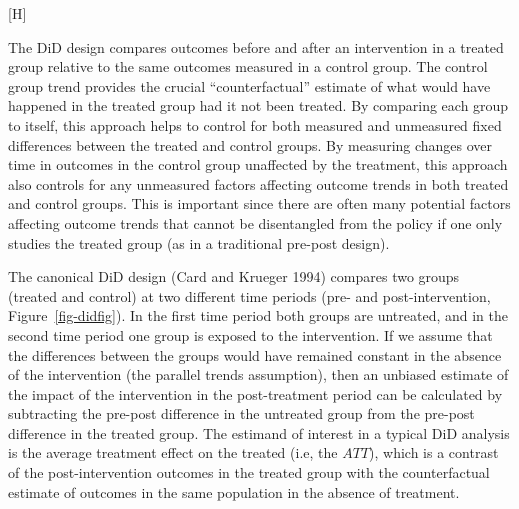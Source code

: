\documentclass[
  letterpaper,
  DIV=11,
  numbers=noendperiod]{scrartcl}
\makeatletter
\renewenvironment{figure}%
   {\renewcommand\familydefault\sfdefault
    \@float{figure}}
   {\end@float}
\providecommand{\DIFaddbeginFL}{} %
\providecommand{\DIFaddendFL}{} %
\providecommand{\DIFdelbeginFL}{} %
\providecommand{\DIFdelendFL}{} %
\newcommand{\DIFscaledelfig}{0.5}
\newlength{\DIFdelgraphicswidth} %
\newlength{\DIFdelgraphicsheight} %
\newcommand{\DIFaddincludegraphics}[2][]{{\color{blue}\fbox{\DIFOincludegraphics[#1]{#2}}}} %
\newcommand{\DIFdelincludegraphics}[2][]{%
\sbox{\DIFdelgraphicsbox}{\DIFOincludegraphics[#1]{#2}}%
\settoboxwidth{\DIFdelgraphicswidth}{\DIFdelgraphicsbox} %
\settoboxtotalheight{\DIFdelgraphicsheight}{\DIFdelgraphicsbox} %
\scalebox{\DIFscaledelfig}{%
\parbox[b]{\DIFdelgraphicswidth}{\usebox{\DIFdelgraphicsbox}\\[-\baselineskip] \rule{\DIFdelgraphicswidth}{0em}}\llap{\resizebox{\DIFdelgraphicswidth}{\DIFdelgraphicsheight}{%
\setlength{\unitlength}{\DIFdelgraphicswidth}%
\begin{picture}(1,1)%
\thicklines\linethickness{2pt} %
{\color[rgb]{1,0,0}\put(0,0){\framebox(1,1){}}}%
{\color[rgb]{1,0,0}\put(0,0){\line( 1,1){1}}}%
{\color[rgb]{1,0,0}\put(0,1){\line(1,-1){1}}}%
\end{picture}%
}\hspace*{3pt}}} %
} %
\DeclareRobustCommand{\DIFaddbeginFL}{\DIFOaddbeginFL \let\includegraphics\DIFaddincludegraphics} %
\DeclareRobustCommand{\DIFaddendFL}{\DIFOaddendFL \let\includegraphics\DIFOincludegraphics} %
\DeclareRobustCommand{\DIFdelbeginFL}{\DIFOdelbeginFL \let\includegraphics\DIFdelincludegraphics} %
\DeclareRobustCommand{\DIFdelendFL}{\DIFOaddendFL \let\includegraphics\DIFOincludegraphics} %
\makeatother
\begin{document}
\begin{figure}[H]

\DIFdelbeginFL %
\DIFdelendFL \DIFaddbeginFL {}
\DIFaddendFL 

\DIFdelbeginFL %

\DIFdelendFL \caption{\label{fig-didfig}Stylized example of
difference-in-differences}

\end{figure}%

The DiD design compares outcomes before and after an intervention in a
treated group relative to the same outcomes measured in a control group.
The control group trend provides the crucial ``counterfactual'' estimate
of what would have happened in the treated group had it not been
treated. By comparing each group to itself, this approach helps to
control for both measured and unmeasured fixed differences between the
treated and control groups. By measuring changes over time in outcomes
in the control group unaffected by the treatment, this approach also
controls for any unmeasured factors affecting outcome trends in both
treated and control groups. This is important since there are often many
potential factors affecting outcome trends that cannot be disentangled
from the policy if one only studies the treated group (as in a
traditional pre-post design).

The canonical DiD design (Card and Krueger 1994) compares two groups
(treated and control) at two different time periods (pre- and
post-intervention, Figure~\ref{fig-didfig}). In the first time period
both groups are untreated, and in the second time period one group is
exposed to the intervention. If we assume that the differences between
the groups would have remained constant in the absence of the
intervention (the parallel trends assumption), then an unbiased estimate
of the impact of the intervention in the post-treatment period can be
calculated by subtracting the pre-post difference in the untreated group
from the pre-post difference in the treated group. The estimand of
interest in a typical DiD analysis is the average treatment effect on
the treated (i.e, the \(ATT\)), which is a contrast of the
post-intervention outcomes in the treated group with the counterfactual
estimate of outcomes in the same population in the absence of treatment.
\end{document}
